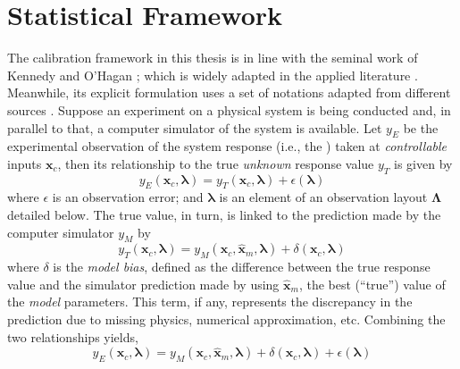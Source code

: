 \section{Statistical Framework}\label{sec:bc_statistical_framework}

The calibration framework in this thesis is in line with the seminal work of Kennedy and O'Hagan \cite{Kennedy2001};
which is widely adapted in the applied literature \cite{Bayarri2007,Higdon2008,Arendt2012,Reichert2012,Higdon2013}.
Meanwhile, its explicit formulation uses a set of notations adapted from different sources \cite{Kennedy2001,Santner2003,Huard2006,Reichert2012,Wicaksono2016}.
Suppose an experiment on a physical system is being conducted and, in parallel to that, a computer simulator of the system is available.
Let $y_E$ be the experimental observation of the system response (i.e., the ) taken at \emph{controllable} inputs $\bm{x}_c$,
then its relationship to the true \emph{unknown} response value $y_T$ is given by
\begin{equation}
    y_E(\bm{x}_c, \bm{\lambda}) = y_T (\bm{x}_c, \bm{\lambda}) + \epsilon(\bm{\lambda})
\label{eq:bc_observation_true}
\end{equation}
where $\epsilon$ is an observation error;
and $\boldsymbol{\lambda}$ is an element of an observation layout $\boldsymbol{\Lambda}$ detailed below.
The true value, in turn, is linked to the prediction made by the computer simulator $y_M$ by
\begin{equation}
    y_T(\bm{x}_c, \boldsymbol{\lambda}) = y_M (\bm{x}_c, \hat{\bm{x}}_m, \boldsymbol{\lambda}) + \delta (\bm{x}_c, \boldsymbol{\lambda})
\label{eq:bc_true_simulation}
\end{equation}
where $\delta$ is the \emph{model bias}, defined as the difference between the true response value and the simulator prediction made by using $\hat{\bm{x}}_m$, the best (``true'') value of the \emph{model} parameters.
This term, if any, represents the discrepancy in the prediction due to missing physics, numerical approximation, etc. 
Combining the two relationships yields,
\begin{equation}
    y_E(\bm{x}_c, \boldsymbol{\lambda}) = y_M (\bm{x}_c, \hat{\bm{x}}_m, \boldsymbol{\lambda}) + \delta (\bm{x}_c, \boldsymbol{\lambda}) + \epsilon(\bm{\lambda})
\label{eq:bc_observation_true}
\end{equation}
